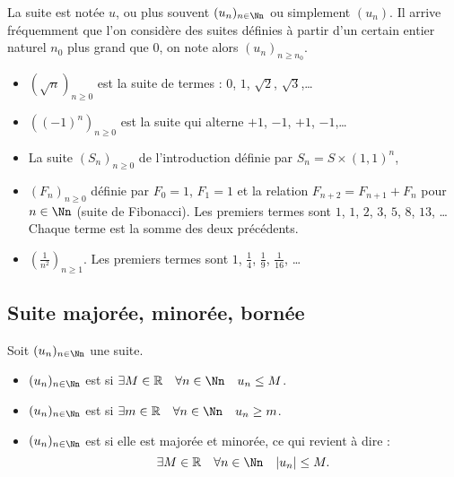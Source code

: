 \documentclass[class=report,crop=false]{standalone}
\begin{document}
La suite est notée $u$, ou plus souvent $(u_n)_{n\in \Nn}$ ou simplement $(u_n)$.
Il arrive fréquemment que l'on considère des suites
définies à partir d'un certain entier naturel $n_0$ plus grand que $0$, on note alors $(u_n)_{n\geq n_0}$.
\begin{exemple}
\sauteligne
    \begin{itemize}
      \item $(\sqrt{n})_{n\geq 0}$ est la suite de termes : $0$, $1$, $\sqrt2$, $\sqrt3$,\ldots
      \item $((-1)^n)_{n\geq 0}$ est la suite qui alterne $+1$, $-1$, $+1$, $-1$,\ldots
      \item La suite $(S_n)_{n\geq 0}$ de l'introduction définie par $S_n=S\times (1,1)^n$,
      \item $(F_n)_{n\geq 0}$ définie par $F_0=1$, $F_1=1$ et la relation $F_{n+2}=F_{n+1}+F_n$
 pour $n\in \Nn$ (suite de Fibonacci). Les premiers termes sont $1$, $1$, $2$, $3$, $5$, $8$, $13$, \ldots
 Chaque terme est la somme des deux précédents.
      \item $\left(\frac{1}{n^2}\right)_{n\geq 1}$. Les premiers termes sont
      $1$, $\frac14$, $\frac19$, $\frac{1}{16}$, \ldots
    \end{itemize}
\end{exemple}
\subsection{Suite majorée, minorée, bornée}

\begin{definition}
Soit $(u_n)_{n\in \Nn}$ une suite.
\begin{itemize}
  \item $(u_n)_{n\in \Nn}$ est  si \quad $\exists M \in \Rr \quad \forall n\in \Nn \quad u_n \leq M$.
  \item $(u_n)_{n\in \Nn}$ est  si \quad $\exists m \in \Rr \quad  \forall n\in \Nn \quad u_n \geq m$.
  \item $(u_n)_{n\in \Nn}$ est  si elle est majorée et minorée, ce qui revient à dire :
$$\exists M \in \Rr \quad  \forall n\in \Nn \quad |u_n| \leq M.$$
\end{itemize}
\end{definition}

\end{document}
